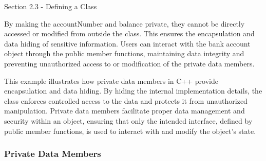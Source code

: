 \begin{notes}{Section 2.3 - Defining a Class}
\begin{highlight}
        By making the accountNumber and balance private, they cannot be directly accessed or modified from outside the class. This ensures the encapsulation and data hiding of sensitive information. 
        Users can interact with the bank account object through the public member functions, maintaining data integrity and preventing unauthorized access to or modification of the private data members.
    
        This example illustrates how private data members in C++ provide encapsulation and data hiding. By hiding the internal implementation details, the class enforces controlled access to the data 
        and protects it from unauthorized manipulation. Private data members facilitate proper data management and security within an object, ensuring that only the intended interface, defined by public member 
        functions, is used to interact with and modify the object's state.
    \end{highlight}
\end{notes}

\subsubsection*{Private Data Members}

